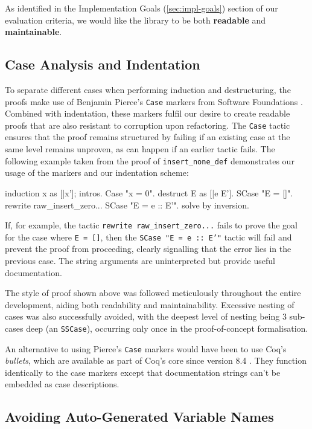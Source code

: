 \documentclass[]{unswthesis}
\let\c\texttt
\let\i\textit
\let\b\textbf
\begin{document}
As identified in the Implementation Goals (\cref{sec:impl-goals}) section of our evaluation criteria, we would like the library to be both \b{readable} and \b{maintainable}.

\subsection{Case Analysis and Indentation}

To separate different cases when performing induction and destructuring, the proofs make use of Benjamin Pierce's \c{Case} markers from Software Foundations \cite{pierce15}. Combined with indentation, these markers fulfil our desire to create readable proofs that are also resistant to corruption upon refactoring. The \c{Case} tactic ensures that the proof remains structured by failing if an existing case at the same level remains unproven, as can happen if an earlier tactic fails. The following example taken from the proof of \c{insert_none_def} demonstrates our usage of the markers and our indentation scheme:

\begin{coqcode}
induction x as [|x']; intros.
Case "x = 0".
  destruct E as [|e E'].
  SCase "E = []".
    rewrite raw_insert_zero...
  SCase "E = e :: E'".
    solve by inversion.
\end{coqcode}

If, for example, the tactic \c{rewrite raw_insert_zero...} fails to prove the goal for the case where \c{E = []}, then the \c{SCase "E = e :: E'"} tactic will fail and prevent the proof from proceeding, clearly signalling that the error lies in the previous case. The string arguments are uninterpreted but provide useful documentation.

The style of proof shown above was followed meticulously throughout the entire development, aiding both readability and maintainability. Excessive nesting of cases was also successfully avoided, with the deepest level of nesting being 3 sub-cases deep (an \c{SSCase}), occurring only once in the proof-of-concept formalisation.

An alternative to using Pierce's \c{Case} markers would have been to use Coq's \i{bullets}, which are available as part of Coq's core since version 8.4 \cite{coqRefMan}. They function identically to the case markers except that documentation strings can't be embedded as case descriptions.

\subsection{Avoiding Auto-Generated Variable Names}
\end{document}
